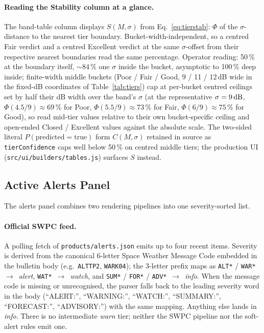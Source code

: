 \documentclass[11pt,a4paper]{article}
\newcommand{\SI}[2]{#1\,\text{#2}}
\newcommand{\dB}{\text{dB}}
\begin{document}
\paragraph{Reading the Stability column at a glance.}  The
band-table column displays $S(M, \sigma)$ from
Eq.~\ref{eq:tierstab}: $\Phi$ of the $\sigma$-distance to the
nearest tier boundary.  Bucket-width-independent, so a centred
Fair verdict and a centred Excellent verdict at the same
$\sigma$-offset from their respective nearest boundaries read the
same percentage.  Operator reading: 50\,\% at the boundary itself,
${\sim}84$\,\% one $\sigma$ inside the bucket, asymptotic to
100\,\% deep inside; finite-width middle buckets (Poor / Fair /
Good, 9 / 11 / 12\,dB wide in the fixed-dB coordinates of
Table~\ref{tab:tiers}) cap at per-bucket centred ceilings set by
half their dB width over the band's $\sigma$ (at the
representative $\sigma = \SI{9}{\dB}$,
$\Phi(4.5/9) \approx 69\,\%$ for Poor, $\Phi(5.5/9) \approx
73\,\%$
for Fair, $\Phi(6/9) \approx 75\,\%$ for Good), so read
mid-tier values relative to their
own bucket-specific ceiling and open-ended Closed / Excellent
values against the absolute scale.
The two-sided literal $P(\text{predicted}=\text{true})$ form
$C(M, \sigma)$ retained in source as \texttt{tierConfidence}
caps well below 50\,\% on centred middle tiers; the production UI
(\texttt{src/ui/builders/tables.js}) surfaces $S$ instead.

\subsection{Active Alerts Panel}\label{sec:alerts}

The alerts panel combines two rendering pipelines into one
severity-sorted list.

\paragraph{Official SWPC feed.}  A polling fetch of
\texttt{products/alerts.json} emits up to four recent items.
Severity is derived from the canonical 6-letter Space Weather
Message Code embedded in the bulletin body
(e.g.~\texttt{ALTTP2}, \texttt{WARK04}); the 3-letter prefix
maps as \texttt{ALT*} / \texttt{WAR*}~$\to$~\emph{alert},
\texttt{WAT*}~$\to$~\emph{watch}, and \texttt{SUM*} /
\texttt{FOR*} / \texttt{ADV*}~$\to$~\emph{info}.  When the
message code is missing or unrecognised, the parser falls back
to the leading severity word in the body (``ALERT:'',
``WARNING:'', ``WATCH:'', ``SUMMARY:'', ``FORECAST:'',
``ADVISORY:'') with the same mapping.  Anything else lands in
\emph{info}.  There is no intermediate \emph{warn} tier;
neither the
SWPC pipeline nor the soft-alert rules emit one.
\end{document}
